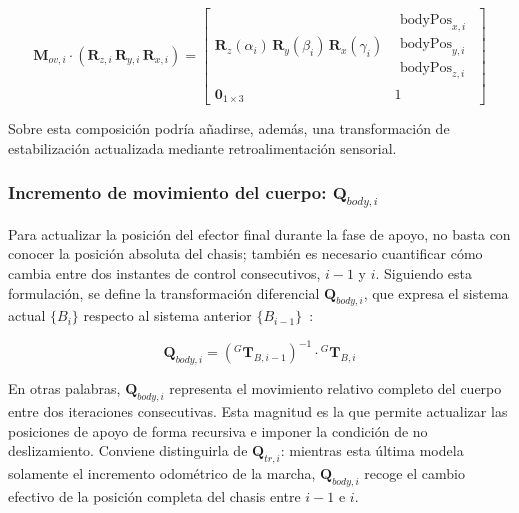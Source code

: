 \begin{equation}
    \renewcommand{\arraystretch}{1.3} %
    \mathbf{M}_{ov,i} \cdot \left( \mathbf{R}_{z,i}\,\mathbf{R}_{y,i}\,\mathbf{R}_{x,i} \right)
    =
    \left[
    \begin{array}{c|c}
      \mathbf{R}_{z}(\alpha_i)\,\mathbf{R}_{y}(\beta_i)\,\mathbf{R}_{x}(\gamma_i) & 
      \begin{matrix}
         \mathrm{bodyPos}_{x,i} \\ 
         \mathrm{bodyPos}_{y,i} \\ 
         \mathrm{bodyPos}_{z,i}
      \end{matrix} \\
      \hline
      \mathbf{0}_{1\times 3} & 1
    \end{array}
    \right]
    \label{eq:T_user_compact}
\end{equation}

Sobre esta composición podría añadirse, además, una transformación de estabilización actualizada mediante retroalimentación sensorial.

\subsubsection{Incremento de movimiento del cuerpo: $\mathbf{Q}_{body,i}$}

Para actualizar la posición del efector final durante la fase de apoyo, no basta con conocer la posición absoluta del chasis; también es necesario cuantificar cómo cambia entre dos instantes de control consecutivos, $i-1$ y $i$. Siguiendo esta formulación, se define la transformación diferencial $\mathbf{Q}_{body,i}$, que expresa el sistema actual $\{B_i\}$ respecto al sistema anterior $\{B_{i-1}\}$~\cite{arrigoni2024control}:

\vspace{-1\baselineskip}
\begin{equation}
    \mathbf{Q}_{body,i} = \left({}^{G}\mathbf{T}_{B,i-1}\right)^{-1} \cdot {}^{G}\mathbf{T}_{B,i}
    \label{eq:Qbody_def_full}
\end{equation}

En otras palabras, $\mathbf{Q}_{body,i}$ representa el movimiento relativo completo del cuerpo entre dos iteraciones consecutivas. Esta magnitud es la que permite actualizar las posiciones de apoyo de forma recursiva e imponer la condición de no deslizamiento. Conviene distinguirla de $\mathbf{Q}_{tr,i}$: mientras esta última modela solamente el incremento odométrico de la marcha, $\mathbf{Q}_{body,i}$ recoge el cambio efectivo de la posición completa del chasis entre $i-1$ e $i$.

